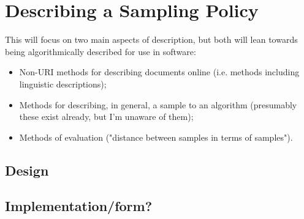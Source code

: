 \section{Describing a Sampling Policy}
This will focus on two main aspects of description, but both will lean towards being algorithmically described for use in software:
\begin{itemize}
	\item Non-URI methods for describing documents online (i.e. methods including linguistic descriptions);
	\item Methods for describing, in general, a sample to an algorithm (presumably these exist already, but I'm unaware of them);
	\item Methods of evaluation ("distance between samples in terms of samples").
\end{itemize}




\subsection{Design}
\subsection{Implementation/form?}
